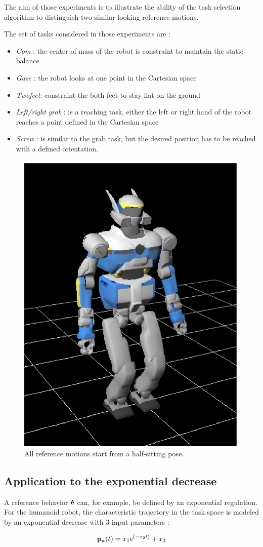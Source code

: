 \documentclass[letterpaper, 10pt, conference]{ieeeconf}      %
\begin{document}
The aim of those experiments is to illustrate the ability of the
task selection algorithm to distinguish two similar looking reference motions.

The set of tasks considered in those experiments are :

\begin{itemize}
  \item \emph{Com} : the center of mass of the robot is constraint to maintain the static balance
  \item \emph{Gaze} : the robot looks at one point in the Cartesian space
  \item \emph{Twofeet}: constraint the both feet to stay flat on the ground
  \item \emph{Left/right grab} : is a reaching task, either the left or right hand
of the robot reaches a point defined in the Cartesian space
\item \emph{Screw} : is similar to the grab task, but the desired position
has to be reached with a defined orientation.
\end{itemize}
\begin{figure}[t]
\begin{center}
\includegraphics[width=0.3\linewidth]{img/halfSit.ps}
\end{center}
\caption{All reference motions start from a half-sitting pose.}
\label{fig:halfSit}
\end{figure}

\subsection{Application to the exponential decrease}
A reference behavior ${\mathbf{\dot{e}}}$ can, for example, be defined by an exponential regulation.
For the humanoid robot, the characteristic trajectory in the task
space is modeled by an
exponential decrease with 3 input parameters :

\begin{equation}
{\mathbf{p}}_{{\mathbf{x}}}(t) = x_1 \mathrm{e}^{(-x_2 t)} + x_3
\label{eqTask}
\end{equation}
\end{document}

